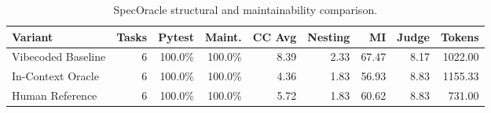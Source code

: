 \begin{table}[t]
\centering
\caption{SpecOracle structural and maintainability comparison.}
\label{tab:specoracle-comparison}
\begin{tabular}{lrrrrrrrr}
\hline
Variant & Tasks & Pytest & Maint. & CC Avg & Nesting & MI & Judge & Tokens \\
\hline
Vibecoded Baseline & 6 & 100.0\% & 100.0\% & 8.39 & 2.33 & 67.47 & 8.17 & 1022.00 \\
In-Context Oracle & 6 & 100.0\% & 100.0\% & 4.36 & 1.83 & 56.93 & 8.83 & 1155.33 \\
Human Reference & 6 & 100.0\% & 100.0\% & 5.72 & 1.83 & 60.62 & 8.83 & 731.00 \\
\hline
\end{tabular}
\end{table}
